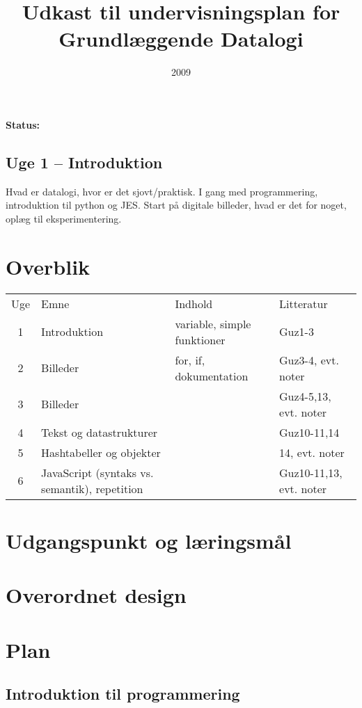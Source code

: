 \documentclass[12pt]{article}
\title{Udkast til undervisningsplan for \\Grundlæggende Datalogi}
\date{2009}
\begin{document}
\maketitle

\paragraph{Status:}


\subsection{Uge 1 -- Introduktion}
Hvad er datalogi, hvor er det sjovt/praktisk. 
I gang med programmering, introduktion til python og JES.
Start på digitale billeder, hvad er det for noget, oplæg til eksperimentering.
\setcounter{tocdepth}{1}
\tableofcontents
\section{Overblik}
\begin{tabular}{cp{7em}p{15em}p{5em}}
Uge&Emne&Indhold&Litteratur\\
1&Introduktion& variable, simple funktioner & Guz1-3\\
2&Billeder& for, if, dokumentation & Guz3-4, evt. noter\\
3&Billeder& & Guz4-5,13, evt. noter\\
4&Tekst og datastrukturer& & Guz10-11,14 \\
5&Hashtabeller og objekter& & 14, evt. noter\\
6&JavaScript (syntaks vs. semantik), repetition& & Guz10-11,13, evt. noter\\
\end{tabular}
\section{Udgangspunkt og læringsmål}

\section{Overordnet design}
\section{Plan}
\subsection{Introduktion til programmering }
\end{document}
